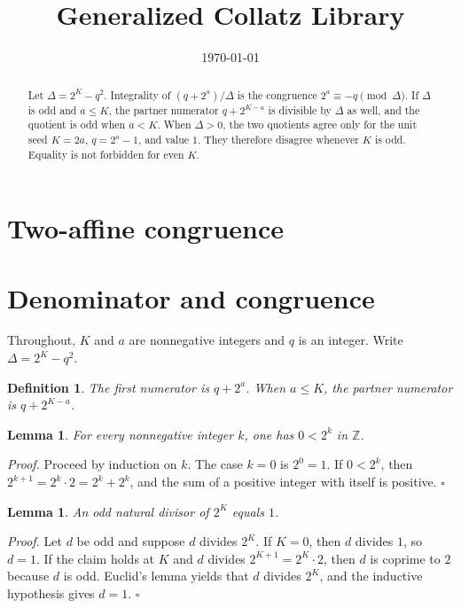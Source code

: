 \documentclass[11pt,letterpaper]{article}
\title{Generalized Collatz Library}
\author{}
\date{\today}
\newcommand{\Z}{\mathbb{Z}}
\newtheorem{lemma}[theorem]{Lemma}
\newtheorem{definition}[theorem]{Definition}
\newenvironment{proof}{\noindent\textit{Proof.}}{\hfill\(\square\)}
\begin{document}
\maketitle
\section*{Two-affine congruence}

\begin{abstract}
Let \(\Delta=2^{K}-q^{2}\). Integrality of \((q+2^{a})/\Delta\) is the congruence \(2^{a}\equiv -q\pmod{\Delta}\). If \(\Delta\) is odd and \(a\le K\), the partner numerator \(q+2^{K-a}\) is divisible by \(\Delta\) as well, and the quotient is odd when \(a<K\). When \(\Delta>0\), the two quotients agree only for the unit seed \(K=2a\), \(q=2^{a}-1\), and value \(1\). They therefore disagree whenever \(K\) is odd. Equality is not forbidden for even \(K\).
\end{abstract}

\section{Denominator and congruence}

Throughout, \(K\) and \(a\) are nonnegative integers and \(q\) is an integer. Write \(\Delta=2^{K}-q^{2}\).

\begin{definition}
The first numerator is \(q+2^{a}\). When \(a\le K\), the partner numerator is \(q+2^{K-a}\).
\end{definition}

\begin{lemma}
\label{lem:pow-positive}
For every nonnegative integer \(k\), one has \(0<2^{k}\) in \(\Z\).
\end{lemma}

\begin{proof}
Proceed by induction on \(k\). The case \(k=0\) is \(2^{0}=1\). If \(0<2^{k}\), then \(2^{k+1}=2^{k}\cdot 2=2^{k}+2^{k}\), and the sum of a positive integer with itself is positive.
\end{proof}

\begin{lemma}
\label{lem:odd-divisor}
An odd natural divisor of \(2^{K}\) equals \(1\).
\end{lemma}

\begin{proof}
Let \(d\) be odd and suppose \(d\) divides \(2^{K}\). If \(K=0\), then \(d\) divides \(1\), so \(d=1\). If the claim holds at \(K\) and \(d\) divides \(2^{K+1}=2^{K}\cdot 2\), then \(d\) is coprime to \(2\) because \(d\) is odd. Euclid's lemma yields that \(d\) divides \(2^{K}\), and the inductive hypothesis gives \(d=1\).
\end{proof}
\end{document}
